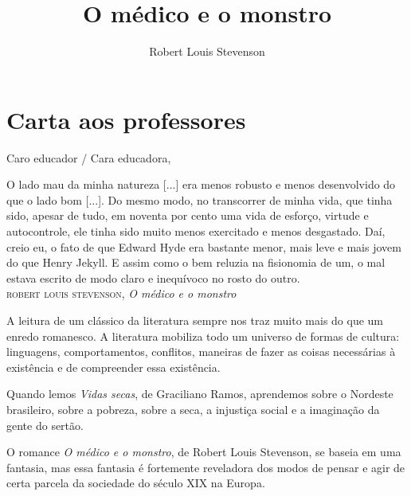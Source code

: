 \documentclass[12pt]{extarticle}
\begin{document}
\newcommand{\AutorLivro}{Robert Louis Stevenson}
\newcommand{\TituloLivro}{O médico e o monstro}
\newcommand{\Tema}{Ficção, mistério e fantasia}
\newcommand{\Genero}{Romance}
\newcommand{\issnppub}{---}
\newcommand{\issnepub}{---}
\newcommand{\colaborador}{\textbf{Fulano de Tal} é uma pessoa incrível e vai fazer um bom serviço.}


\title{\TituloLivro}
\author{\AutorLivro}
\def\authornotes{\colaborador}

\date{}
\maketitle
\tableofcontents

\pagebreak

\section{Carta aos professores}

Caro educador / Cara educadora,\\\bigskip

\begin{flushright}
{\footnotesize
O lado mau da minha natureza {[}...{]} era menos robusto e menos
desenvolvido do que o lado bom {[}...{]}. Do mesmo modo, no transcorrer
de minha vida, que tinha sido, apesar de tudo, em noventa por cento uma
vida de esforço, virtude e autocontrole, ele tinha sido muito menos
exercitado e menos desgastado. Daí, creio eu, o fato de que Edward Hyde
era bastante menor, mais leve e mais jovem do que Henry Jekyll. E assim
como o bem reluzia na fisionomia de um, o mal estava escrito de modo
claro e inequívoco no rosto do outro.\\
\textsc{robert louis stevenson}, \emph{O médico e o monstro}
}
\end{flushright}

A leitura de um clássico da literatura sempre nos traz muito mais do que
um enredo romanesco. A literatura mobiliza todo um universo de formas de
cultura: linguagens, comportamentos, conflitos, maneiras de fazer as
coisas necessárias à existência e de compreender essa existência.

Quando lemos \emph{Vidas secas}, de Graciliano Ramos, aprendemos sobre o
Nordeste brasileiro, sobre a pobreza, sobre a seca, a injustiça social e
a imaginação da gente do sertão.

O romance \emph{O médico e o monstro}, de Robert Louis Stevenson, se
baseia em uma fantasia, mas essa fantasia é fortemente reveladora dos
modos de pensar e agir de certa parcela da sociedade do século XIX na
Europa.
\end{document}
